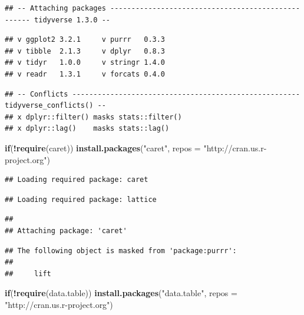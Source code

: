 \documentclass[]{article}
\newenvironment{Shaded}{\begin{snugshade}}{\end{snugshade}}
\newcommand{\ControlFlowTok}[1]{\textcolor[rgb]{0.13,0.29,0.53}{\textbf{#1}}}
\newcommand{\DataTypeTok}[1]{\textcolor[rgb]{0.13,0.29,0.53}{#1}}
\newcommand{\KeywordTok}[1]{\textcolor[rgb]{0.13,0.29,0.53}{\textbf{#1}}}
\newcommand{\NormalTok}[1]{#1}
\newcommand{\OperatorTok}[1]{\textcolor[rgb]{0.81,0.36,0.00}{\textbf{#1}}}
\newcommand{\StringTok}[1]{\textcolor[rgb]{0.31,0.60,0.02}{#1}}
\begin{document}
\begin{verbatim}
## -- Attaching packages --------------------------------------------------- tidyverse 1.3.0 --
\end{verbatim}

\begin{verbatim}
## v ggplot2 3.2.1     v purrr   0.3.3
## v tibble  2.1.3     v dplyr   0.8.3
## v tidyr   1.0.0     v stringr 1.4.0
## v readr   1.3.1     v forcats 0.4.0
\end{verbatim}

\begin{verbatim}
## -- Conflicts ------------------------------------------------------ tidyverse_conflicts() --
## x dplyr::filter() masks stats::filter()
## x dplyr::lag()    masks stats::lag()
\end{verbatim}

\begin{Shaded}
\begin{Highlighting}[]
\ControlFlowTok{if}\NormalTok{(}\OperatorTok{!}\KeywordTok{require}\NormalTok{(caret)) }\KeywordTok{install.packages}\NormalTok{(}\StringTok{"caret"}\NormalTok{, }\DataTypeTok{repos =} \StringTok{"http://cran.us.r-project.org"}\NormalTok{)}
\end{Highlighting}
\end{Shaded}

\begin{verbatim}
## Loading required package: caret
\end{verbatim}

\begin{verbatim}
## Loading required package: lattice
\end{verbatim}

\begin{verbatim}
## 
## Attaching package: 'caret'
\end{verbatim}

\begin{verbatim}
## The following object is masked from 'package:purrr':
## 
##     lift
\end{verbatim}

\begin{Shaded}
\begin{Highlighting}[]
\ControlFlowTok{if}\NormalTok{(}\OperatorTok{!}\KeywordTok{require}\NormalTok{(data.table)) }\KeywordTok{install.packages}\NormalTok{(}\StringTok{"data.table"}\NormalTok{, }\DataTypeTok{repos =} \StringTok{"http://cran.us.r-project.org"}\NormalTok{)}
\end{Highlighting}
\end{Shaded}
\end{document}

